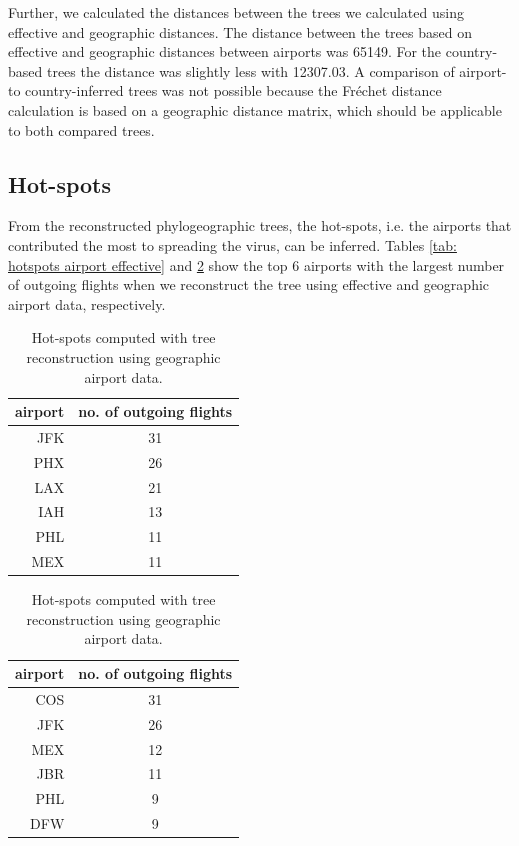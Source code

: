 \documentclass{article}
\begin{document}
Further, we calculated the distances between the trees we calculated using effective and geographic distances. The distance between the trees based on effective and geographic distances between airports was 65149. For the country-based trees the distance was slightly less with 12307.03. A comparison of airport- to country-inferred trees was not possible because the Fr\'{e}chet distance calculation is based on a geographic distance matrix, which should be applicable to both compared trees.

\subsection{Hot-spots}
From the reconstructed phylogeographic trees, the hot-spots, i.e. the airports that contributed the most to spreading the virus, can be inferred. Tables \ref{tab: hotspots airport effective} and \ref{tab: hotspots airport geographic} show the top 6 airports with the largest number of outgoing flights when we reconstruct the tree using effective and geographic airport data, respectively.


\begin{table}[h!]
\centering
\parbox{.45\linewidth}{
\centering
\begin{tabular}{r|c}
airport & no. of outgoing flights \\
\hline
JFK      & 31                      \\
PHX      & 26                      \\
LAX      & 21                      \\
IAH      & 13                      \\
PHL      & 11                      \\
MEX      & 11                                     
\end{tabular}
\caption{Hot-spots computed with tree reconstruction using effective airport data.}
\label{tab: hotspots airport effective}
}
\qquad
\parbox{.45\linewidth}{
\centering
\begin{tabular}{r|c}
airport & no. of outgoing flights \\
\hline
COS      & 31                      \\
JFK      & 26                      \\
MEX      & 12                      \\
JBR      & 11                      \\
PHL      & 9                       \\
DFW      & 9                                
\end{tabular}
\caption{Hot-spots computed with tree reconstruction using geographic airport data.}
\label{tab: hotspots airport geographic}
}
\end{table}
\end{document}
